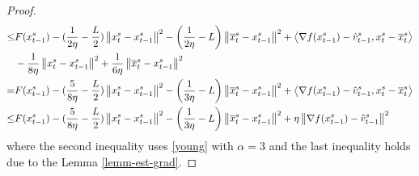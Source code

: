 \documentclass[iicol,sn-basic]{sn-jnl}
\theoremstyle{thmstyleone}%
\theoremstyle{thmstyletwo}%
\theoremstyle{thmstylethree}%
\newcommand{\norm}[1]{\left\lVert#1\right\rVert}
\newcommand{\Iprod}[2]{\left\langle #1,#2\right\rangle}
\begin{document}
\begin{proof}
\begin{align}
 \leq & F({x}_{t-1}^s)  -(\frac{1}{2\eta} - \frac{L}{2})\norm{{x}_t^s-x_{t-1}^s}^2- \left(\frac{1}{2\eta}-L\right)\norm{\overline{x}_t^s-x_{t-1}^s}^2+\Iprod{\nabla f(x_{t-1}^s)-\hat{v}_{t-1}^s}{x_t^s - \overline{x}_t^s}\notag\\
 & -\frac{1}{8\eta} \norm{x_t^s-{x}_{t-1}^s}^2 + \frac{1}{6\eta} \norm{\overline{x}_{t}^s-{x}_{t-1}^s}^2\label{eq18}\\
  = &  F({x}_{t-1}^s)  -(\frac{5}{8\eta} - \frac{L}{2})\norm{{x}_t^s-x_{t-1}^s}^2- \left(\frac{1}{3\eta}-L\right)\norm{\overline{x}_t^s-x_{t-1}^s}^2+\Iprod{\nabla f(x_{t-1}^s)-\hat{v}_{t-1}^s}{x_t^s - \overline{x}_t^s}\notag\\
  \leq & F({x}_{t-1}^s)  -(\frac{5}{8\eta} - \frac{L}{2})\norm{{x}_t^s-x_{t-1}^s}^2- \left(\frac{1}{3\eta}-L\right)\norm{\overline{x}_t^s-x_{t-1}^s}^2+\eta \norm{\nabla f(x_{t-1}^s)-\hat{v}_{t-1}^s}^2\label{eq19}
 \end{align}
 where the second inequality uses \eqref{young} with $\alpha = 3$ and the last inequality holds due to the Lemma \ref{lemm-est-grad}.
 

\end{proof}
\end{document}
